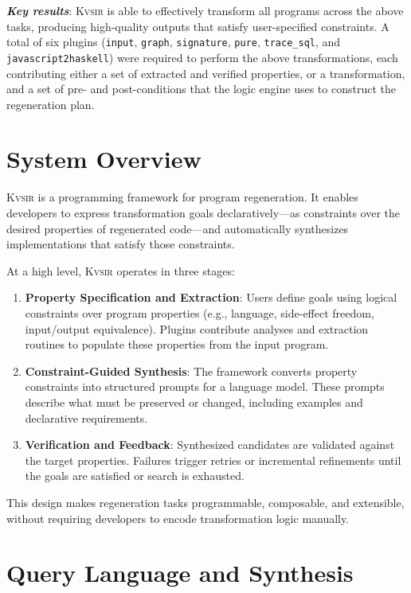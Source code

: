 \documentclass[sigplan,review,anonymous,10pt]{acmart}
\newcommand{\sys}{{\scshape Kv{\textalpha}sir}\xspace}
\newcommand{\heading}[1]{\vspace{2pt}\noindent\textbf{\emph{#1}}:\enspace}
\newcommand{\ttt}[1]{\texttt{#1}\xspace}
\begin{document}
\heading{Key results}
\sys is able to effectively transform all programs across the above tasks,
producing high-quality outputs that satisfy user-specified constraints.
A total
of six plugins (\ttt{input}, \ttt{graph}, \ttt{signature}, \ttt{pure}, \ttt{trace\_sql}, and \ttt{javascript2haskell})
were required to perform the above transformations, each
contributing either a set of extracted and verified properties, or a
transformation, and a set of pre- and post-conditions that the logic engine
uses to construct the regeneration plan.

\section{System Overview}
\label{sec:design}

\sys is a programming framework for program regeneration. It enables developers to express transformation goals declaratively—as constraints over the desired properties of regenerated code—and automatically synthesizes implementations that satisfy those constraints.

At a high level, \sys operates in three stages:

\begin{enumerate}
  \item \textbf{Property Specification and Extraction}: Users define goals using logical constraints over program properties (e.g., language, side-effect freedom, input/output equivalence). Plugins contribute analyses and extraction routines to populate these properties from the input program.
  \item \textbf{Constraint-Guided Synthesis}: The framework converts property constraints into structured prompts for a language model. These prompts describe what must be preserved or changed, including examples and declarative requirements.
  \item \textbf{Verification and Feedback}: Synthesized candidates are validated against the target properties. Failures trigger retries or incremental refinements until the goals are satisfied or search is exhausted.
\end{enumerate}

This design makes regeneration tasks programmable, composable, and extensible, without requiring developers to encode transformation logic manually.

\section{Query Language and Synthesis}
\label{sec:synthesis}
\end{document}
